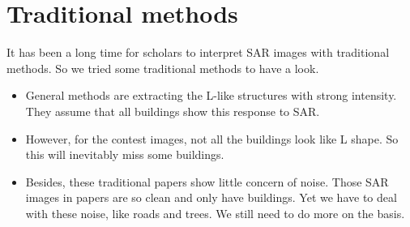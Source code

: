 \documentclass[]{IEEEtran}
\begin{document}
\section{Traditional methods}
	It has been a long time for scholars to interpret SAR images with traditional methods. So we tried some traditional methods to have a look.
	\begin{itemize}
		\item General methods are extracting the L-like structures with strong intensity. They assume that all buildings show this response to SAR.  
		\item However, for the contest images, not all the buildings look like L shape. So this will inevitably miss some buildings.
		\item Besides, these traditional papers show little concern of noise. Those SAR images in papers are so clean and only have buildings. Yet we have to deal with these noise, like roads and trees. We still need to do more on the basis.
	\end{itemize}
\newpage
\end{document}
